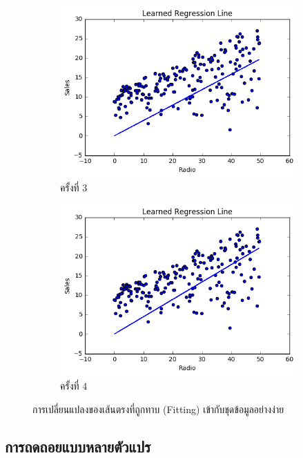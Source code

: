 \begin{figure}[H]
\begin{subfigure}{0.5\textwidth}
        \includegraphics[width=\linewidth]{fig/plot_simple_reg_3.png}
        \caption{ครั้งที่ 3}
        \label{fig:plot_simple_reg_3}
    \end{subfigure}%
    \begin{subfigure}{0.5\textwidth}
        \centering
        \includegraphics[width=\linewidth]{fig/plot_simple_reg_4.png}
        \caption{ครั้งที่ 4}
        \label{fig:plot_simple_reg_4}
    \end{subfigure}
    \caption{การเปลี่ยนแปลงของเส้นตรงที่ถูกทาบ (Fitting) เข้ากับชุดข้อมูลอย่างง่าย}
    \label{fig:simple_reg_change}
\end{figure}

\subsection{การถดถอยแบบหลายตัวแปร}
\label{ssec:multi_lin_res}

